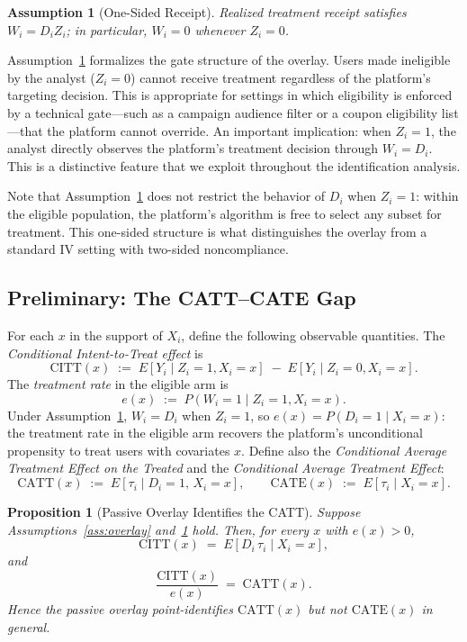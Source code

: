 \documentclass[11pt]{article}
\newtheorem{assumption}{Assumption}
\newtheorem{proposition}{Proposition}
\begin{document}
\begin{assumption}[One-Sided Receipt]
\label{ass:onesided}
Realized treatment receipt satisfies $W_i = D_i Z_i$; in particular, $W_i = 0$
whenever $Z_i = 0$.
\end{assumption}

Assumption~\ref{ass:onesided} formalizes the gate structure of the overlay.
Users made ineligible by the analyst ($Z_i = 0$) cannot receive treatment
regardless of the platform's targeting decision.  This is appropriate for
settings in which eligibility is enforced by a technical gate---such as a
campaign audience filter or a coupon eligibility list---that the platform cannot
override.  An important implication: when $Z_i = 1$, the analyst directly
observes the platform's treatment decision through $W_i = D_i$.  This is a
distinctive feature that we exploit throughout the identification analysis.

Note that Assumption~\ref{ass:onesided} does not restrict the behavior of $D_i$
when $Z_i = 1$: within the eligible population, the platform's algorithm is free
to select any subset for treatment.  This one-sided structure is what
distinguishes the overlay from a standard IV setting with two-sided noncompliance.

\subsection{Preliminary: The CATT--CATE Gap}
\label{subsec:passive}

For each $x$ in the support of $X_i$, define the following observable
quantities.  The \emph{Conditional Intent-to-Treat effect} is
\[
  \mathrm{CITT}(x) \;:=\; E[Y_i \mid Z_i=1, X_i=x] \;-\; E[Y_i \mid Z_i=0, X_i=x].
\]
The \emph{treatment rate} in the eligible arm is
\[
  e(x) \;:=\; P(W_i=1 \mid Z_i=1, X_i=x).
\]
Under Assumption~\ref{ass:onesided}, $W_i = D_i$ when $Z_i=1$, so $e(x) =
P(D_i = 1 \mid X_i = x)$: the treatment rate in the eligible arm recovers the
platform's unconditional propensity to treat users with covariates $x$.  Define
also the \emph{Conditional Average Treatment Effect on the Treated} and the
\emph{Conditional Average Treatment Effect}:
\[
  \mathrm{CATT}(x) \;:=\; E[\tau_i \mid D_i=1,\, X_i=x], \qquad
  \mathrm{CATE}(x) \;:=\; E[\tau_i \mid X_i=x].
\]

\begin{proposition}[Passive Overlay Identifies the CATT]
\label{prop:att}
Suppose Assumptions~\ref{ass:overlay} and~\ref{ass:onesided} hold.  Then, for
every $x$ with $e(x) > 0$,
\begin{equation}
  \mathrm{CITT}(x) \;=\; E[D_i\,\tau_i \mid X_i=x],
  \label{eq:itt}
\end{equation}
and
\begin{equation}
  \frac{\mathrm{CITT}(x)}{e(x)} \;=\; \mathrm{CATT}(x).
  \label{eq:catt}
\end{equation}
Hence the passive overlay point-identifies $\mathrm{CATT}(x)$ but not
$\mathrm{CATE}(x)$ in general.
\end{proposition}
\end{document}
